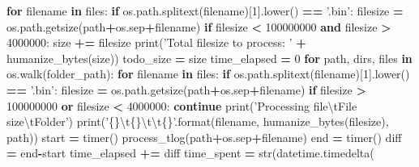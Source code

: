 \documentclass[12pt,oneside]{reedthesis}
\newenvironment{Shaded}{\begin{snugshade}}{\end{snugshade}}
\newcommand{\KeywordTok}[1]{\textcolor[rgb]{0.13,0.29,0.53}{\textbf{#1}}}
\newcommand{\DecValTok}[1]{\textcolor[rgb]{0.00,0.00,0.81}{#1}}
\newcommand{\CharTok}[1]{\textcolor[rgb]{0.31,0.60,0.02}{#1}}
\newcommand{\SpecialCharTok}[1]{\textcolor[rgb]{0.00,0.00,0.00}{#1}}
\newcommand{\StringTok}[1]{\textcolor[rgb]{0.31,0.60,0.02}{#1}}
\newcommand{\ControlFlowTok}[1]{\textcolor[rgb]{0.13,0.29,0.53}{\textbf{#1}}}
\newcommand{\OperatorTok}[1]{\textcolor[rgb]{0.81,0.36,0.00}{\textbf{#1}}}
\newcommand{\BuiltInTok}[1]{#1}
\newcommand{\NormalTok}[1]{#1}
\theoremstyle{definition}
\theoremstyle{definition}
\theoremstyle{definition}
\theoremstyle{remark}
\begin{document}
\begin{Shaded}
\begin{Highlighting}[]
        \ControlFlowTok{for}\NormalTok{ filename }\KeywordTok{in}\NormalTok{ files:}
            \ControlFlowTok{if}\NormalTok{ os.path.splitext(filename)[}\DecValTok{1}\NormalTok{].lower() }\OperatorTok{==} \StringTok{'.bin'}\NormalTok{:}
\NormalTok{                filesize }\OperatorTok{=}\NormalTok{ os.path.getsize(path}\OperatorTok{+}\NormalTok{os.sep}\OperatorTok{+}\NormalTok{filename)}
                \ControlFlowTok{if}\NormalTok{ filesize }\OperatorTok{<} \DecValTok{100000000} \KeywordTok{and}\NormalTok{ filesize }\OperatorTok{>} \DecValTok{4000000}\NormalTok{:}
\NormalTok{                    size }\OperatorTok{+=}\NormalTok{ filesize}
    \BuiltInTok{print}\NormalTok{(}\StringTok{'Total filesize to process: '} \OperatorTok{+}\NormalTok{ humanize_bytes(size))}
\NormalTok{    todo_size }\OperatorTok{=}\NormalTok{ size}
\NormalTok{    time_elapsed }\OperatorTok{=} \DecValTok{0}
    \ControlFlowTok{for}\NormalTok{ path, dirs, files }\KeywordTok{in}\NormalTok{ os.walk(folder_path):}
        \ControlFlowTok{for}\NormalTok{ filename }\KeywordTok{in}\NormalTok{ files:}
            \ControlFlowTok{if}\NormalTok{ os.path.splitext(filename)[}\DecValTok{1}\NormalTok{].lower() }\OperatorTok{==} \StringTok{'.bin'}\NormalTok{:}
\NormalTok{                filesize }\OperatorTok{=}\NormalTok{ os.path.getsize(path}\OperatorTok{+}\NormalTok{os.sep}\OperatorTok{+}\NormalTok{filename)}
                \ControlFlowTok{if}\NormalTok{ filesize }\OperatorTok{>} \DecValTok{100000000} \KeywordTok{or}\NormalTok{ filesize }\OperatorTok{<} \DecValTok{4000000}\NormalTok{:}
                    \ControlFlowTok{continue}
                \BuiltInTok{print}\NormalTok{(}\StringTok{'Processing file}\CharTok{\textbackslash{}t}\StringTok{File size}\CharTok{\textbackslash{}t}\StringTok{Folder'}\NormalTok{)}
                \BuiltInTok{print}\NormalTok{(}\StringTok{'}\SpecialCharTok{\{\}}\CharTok{\textbackslash{}t}\SpecialCharTok{\{\}}\CharTok{\textbackslash{}t\textbackslash{}t}\SpecialCharTok{\{\}}\StringTok{'}\NormalTok{.}\BuiltInTok{format}\NormalTok{(filename, }
\NormalTok{                  humanize_bytes(filesize), path))}
\NormalTok{                start }\OperatorTok{=}\NormalTok{ timer()}
\NormalTok{                process_tlog(path}\OperatorTok{+}\NormalTok{os.sep}\OperatorTok{+}\NormalTok{filename)    }
\NormalTok{                end }\OperatorTok{=}\NormalTok{ timer()}
\NormalTok{                diff }\OperatorTok{=}\NormalTok{ end}\OperatorTok{-}\NormalTok{start}
\NormalTok{                time_elapsed }\OperatorTok{+=}\NormalTok{ diff}
\NormalTok{                time_spent }\OperatorTok{=} \BuiltInTok{str}\NormalTok{(datetime.timedelta(}

\end{Highlighting}
\end{Shaded}
\end{document}
